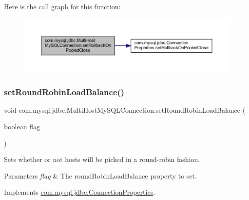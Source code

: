Here is the call graph for this function\+:
\nopagebreak
\begin{figure}[H]
\begin{center}
\leavevmode
\includegraphics[width=350pt]{classcom_1_1mysql_1_1jdbc_1_1_multi_host_my_s_q_l_connection_a1e6e4b6adaf9cf037af7de68ede17aac_cgraph}
\end{center}
\end{figure}
\mbox{\label{classcom_1_1mysql_1_1jdbc_1_1_multi_host_my_s_q_l_connection_abda89933ef464c432ec32e019c84d445}} 
\subsubsection{\texorpdfstring{set\+Round\+Robin\+Load\+Balance()}{setRoundRobinLoadBalance()}}
{\footnotesize\ttfamily void com.\+mysql.\+jdbc.\+Multi\+Host\+My\+S\+Q\+L\+Connection.\+set\+Round\+Robin\+Load\+Balance (\begin{DoxyParamCaption}\item[{boolean}]{flag }\end{DoxyParamCaption})}

Sets whether or not hosts will be picked in a round-\/robin fashion.


\begin{DoxyParams}{Parameters}
{\em flag} & The round\+Robin\+Load\+Balance property to set. \\
\hline
\end{DoxyParams}


Implements \mbox{\hyperlink{interfacecom_1_1mysql_1_1jdbc_1_1_connection_properties_a13ef9e49985c436e69d1a8ed5eb095c6}{com.\+mysql.\+jdbc.\+Connection\+Properties}}.

